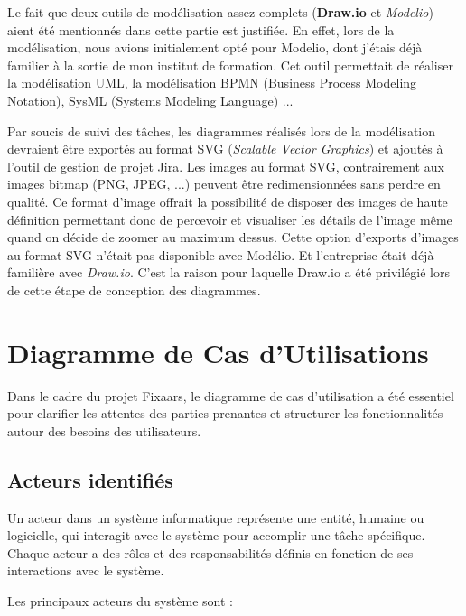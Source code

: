 \vspace{0.35cm}

Le fait que deux outils de modélisation assez complets (\textbf{Draw.io} et \textit{Modelio}) aient été mentionnés dans cette partie est justifiée. En effet, lors de la modélisation, nous avions initialement opté pour Modelio, dont j'étais déjà familier à la sortie de mon institut de formation. Cet outil permettait de réaliser la modélisation UML, la modélisation BPMN (Business Process Modeling Notation), SysML (Systems Modeling Language) ...

\vspace{0.35cm}

Par soucis de suivi des tâches, les diagrammes réalisés lors de la modélisation devraient être exportés au format SVG (\textit{Scalable Vector Graphics}) et ajoutés à l'outil de gestion de projet Jira. Les images au format SVG, contrairement aux images bitmap (PNG, JPEG, ...) peuvent être redimensionnées sans perdre en qualité. Ce format d'image offrait la possibilité de disposer des images de haute définition permettant donc de percevoir et visualiser les détails de l'image même quand on décide de zoomer au maximum dessus. Cette option d'exports d'images au format SVG n'était pas disponible avec Modélio. Et l'entreprise était déjà familière avec \textit{Draw.io}. C'est la raison pour laquelle Draw.io a été privilégié lors de cette étape de conception des diagrammes.

\section{Diagramme de Cas d'Utilisations}
Dans le cadre du projet Fixaars, le diagramme de cas d'utilisation a été essentiel pour clarifier les attentes des parties prenantes et structurer les fonctionnalités autour des besoins des utilisateurs.

\subsection{Acteurs identifiés}
Un acteur dans un système informatique représente une entité, humaine ou logicielle, qui interagit avec le système pour accomplir une tâche spécifique. Chaque acteur a des rôles et des responsabilités définis en fonction de ses interactions avec le système. 

\vspace{0.39cm}

Les principaux acteurs du système sont : 

